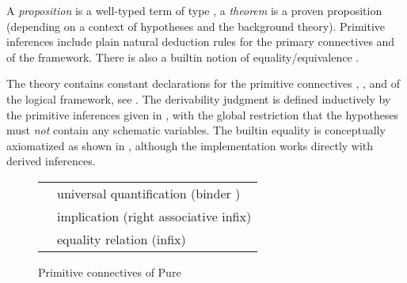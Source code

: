 \begin{isabellebody}
\begin{isamarkuptext}



  A \emph{proposition} is a well-typed term of type , a
  \emph{theorem} is a proven proposition (depending on a context of
  hypotheses and the background theory).  Primitive inferences include
  plain natural deduction rules for the primary connectives \isa{{\isasymAnd}} and \isa{{\isasymLongrightarrow}} of the framework.  There is also a builtin
  notion of equality/equivalence \isa{{\isasymequiv}}.%
\end{isamarkuptext}%
\isamarkuptrue%
%
\isamarkuptrue%
%
\begin{isamarkuptext}%
The theory  contains constant declarations for the
  primitive connectives \isa{{\isasymAnd}}, \isa{{\isasymLongrightarrow}}, and \isa{{\isasymequiv}} of
  the logical framework, see .  The
  derivability judgment  is
  defined inductively by the primitive inferences given in
  , with the global restriction that the
  hypotheses must \emph{not} contain any schematic variables.  The
  builtin equality is conceptually axiomatized as shown in
  , although the implementation works
  directly with derived inferences.

  \begin{figure}[htb]
  \begin{center}
  \begin{tabular}{ll}
  \isa{all\ {\isacharcolon}{\isacharcolon}\ {\isacharparenleft}{\isasymalpha}\ {\isasymRightarrow}\ prop{\isacharparenright}\ {\isasymRightarrow}\ prop} & universal quantification (binder \isa{{\isasymAnd}}) \\
  \isa{{\isasymLongrightarrow}\ {\isacharcolon}{\isacharcolon}\ prop\ {\isasymRightarrow}\ prop\ {\isasymRightarrow}\ prop} & implication (right associative infix) \\
  \isa{{\isasymequiv}\ {\isacharcolon}{\isacharcolon}\ {\isasymalpha}\ {\isasymRightarrow}\ {\isasymalpha}\ {\isasymRightarrow}\ prop} & equality relation (infix) \\
  \end{tabular}
  \caption{Primitive connectives of Pure}\label{fig:pure-connectives}
  \end{center}
  \end{figure}


\end{isamarkuptext}
\end{isabellebody}
